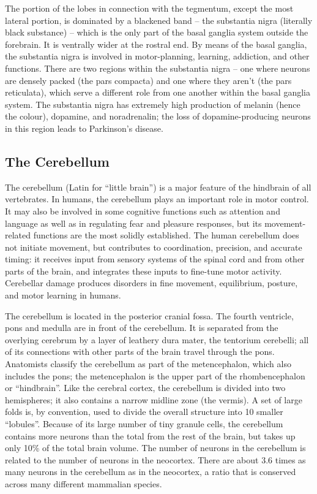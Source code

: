 The portion of the lobes in connection with the tegmentum, except the most lateral portion, is dominated by a blackened band -- the substantia nigra (literally black substance) -- which is the only part of the basal ganglia system outside the forebrain. It is ventrally wider at the rostral end. By means of the basal ganglia, the substantia nigra is involved in motor-planning, learning, addiction, and other functions. There are two regions within the substantia nigra -- one where neurons are densely packed (the pars compacta) and one where they aren't (the pars reticulata), which serve a different role from one another within the basal ganglia system. The substantia nigra has extremely high production of melanin (hence the colour), dopamine, and noradrenalin; the loss of dopamine-producing neurons in this region leads to Parkinson's disease.

\hypertarget{the-cerebellum}{%
\subsection{The Cerebellum}\label{the-cerebellum}}

The cerebellum (Latin for ``little brain'') is a major feature of the hindbrain of all vertebrates. In humans, the cerebellum plays an important role in motor control. It may also be involved in some cognitive functions such as attention and language as well as in regulating fear and pleasure responses, but its movement-related functions are the most solidly established. The human cerebellum does not initiate movement, but contributes to coordination, precision, and accurate timing: it receives input from sensory systems of the spinal cord and from other parts of the brain, and integrates these inputs to fine-tune motor activity. Cerebellar damage produces disorders in fine movement, equilibrium, posture, and motor learning in humans.

The cerebellum is located in the posterior cranial fossa. The fourth ventricle, pons and medulla are in front of the cerebellum. It is separated from the overlying cerebrum by a layer of leathery dura mater, the tentorium cerebelli; all of its connections with other parts of the brain travel through the pons. Anatomists classify the cerebellum as part of the metencephalon, which also includes the pons; the metencephalon is the upper part of the rhombencephalon or ``hindbrain''. Like the cerebral cortex, the cerebellum is divided into two hemispheres; it also contains a narrow midline zone (the vermis). A set of large folds is, by convention, used to divide the overall structure into 10 smaller ``lobules''. Because of its large number of tiny granule cells, the cerebellum contains more neurons than the total from the rest of the brain, but takes up only 10\% of the total brain volume. The number of neurons in the cerebellum is related to the number of neurons in the neocortex. There are about 3.6 times as many neurons in the cerebellum as in the neocortex, a ratio that is conserved across many different mammalian species.



